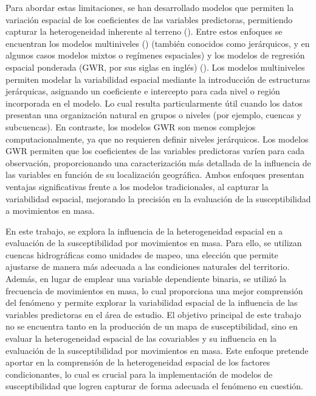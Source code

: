 \documentclass[
  manuscript=article,  
  layout=preprint,  
]{format}
\begin{document}
Para abordar estas limitaciones, se han desarrollado modelos que permiten la variación espacial de los coeficientes de las variables predictoras, permitiendo capturar la heterogeneidad inherente al terreno (\cite{rey2023geographic}). Entre estos enfoques se encuentran los modelos multiniveles (\cite{wong1985hierarchical}) (también conocidos como jerárquicos, y en algunos casos modelos mixtos o regímenes espaciales) y los modelos de regresión espacial ponderada (GWR, por sus siglas en inglés) (\cite{brunsdon1996geographically}). Los modelos multiniveles permiten modelar la variabilidad espacial mediante la introducción de estructuras jerárquicas, asignando un coeficiente e intercepto para cada nivel o región incorporada en el modelo. Lo cual resulta particularmente útil cuando los datos presentan una organización natural en grupos o niveles (por ejemplo, cuencas y subcuencas). En contraste, los modelos GWR son menos complejos computacionalmente, ya que no requieren definir niveles jerárquicos. Los modelos GWR permiten que los coeficientes de las variables predictoras varíen para cada observación, proporcionando una caracterización más detallada de la influencia de las variables en función de su localización geográfica. Ambos enfoques presentan ventajas significativas frente a los modelos tradicionales, al capturar la variabilidad espacial, mejorando la precisión en la evaluación de la susceptibilidad a movimientos en masa.

En este trabajo, se explora la influencia de la heterogeneidad espacial en a evaluación de la susceptibilidad por movimientos en masa. Para ello, se utilizan cuencas hidrográficas como unidades de mapeo, una elección que permite ajustarse de manera más adecuada a las condiciones naturales del territorio. Además, en lugar de emplear una variable dependiente binaria, se utilizó la frecuencia de movimientos en masa, lo cual proporciona una mejor comprensión del fenómeno y permite explorar la variabilidad espacial de la influencia de las variables predictoras en el área de estudio. El objetivo principal de este trabajo no se encuentra tanto en la producción de un mapa de susceptibilidad, sino en evaluar la heterogeneidad espacial de las covariables y su influencia en la evaluación de la susceptibilidad por movimientos en masa. Este enfoque pretende aportar en la comprensión  de la heterogeneidad espacial de los factores condicionantes, lo cual es crucial para la implementación de modelos de susceptibilidad que logren capturar de forma adecuada el fenómeno en cuestión.
\end{document}
